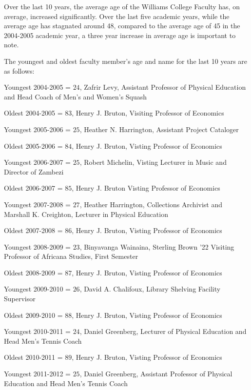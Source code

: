 \documentclass[12pt,a4paper]{article}\usepackage[]{graphicx}\usepackage[]{color}
\theoremstyle{definition}
\begin{document}
\bigskip
Over the last 10 years, the average age of the Williams College Faculty has, on average, increased significantly. Over the last five academic years, while the average age has stagnated around 48, compared to the average age of 45 in the 2004-2005 academic year, a three year increase in average age is important to note.




\bigskip
The youngest and oldest faculty member's age and name for the last 10 years are as follows:

\bigskip
Youngest 2004-2005 = \(24\), Zafrir Levy, Assistant Professor of Physical Education and Head Coach of Men's and Women's Squash

\bigskip
Oldest 2004-2005 = \(83\), Henry J. Bruton, Visiting Professor of Economics

\bigskip
Youngest 2005-2006 = \(25\), Heather N. Harrington, Assistant Project Cataloger

\bigskip
Oldest 2005-2006 = \(84\), Henry J. Bruton, Visting Professor of Economics

\bigskip
Youngest 2006-2007 = \(25\), Robert Michelin, Visting Lecturer in Music and Director of Zambezi

\bigskip
Oldest 2006-2007 = \(85\), Henry J. Bruton Visting Professor of Economics

\bigskip
Youngest 2007-2008 = \(27\), Heather Harrington, Collections Archivist and Marshall K. Creighton, Lecturer in Physical Education

\bigskip
Oldest 2007-2008 = \(86\), Henry J. Bruton, Visting Professor of Economics

\bigskip
Youngest 2008-2009 = \(23\), Binyavanga Wainaina, Sterling Brown '22 Visiting Professor of Africana Studies, First Semester

\bigskip
Oldest 2008-2009 = \(87\), Henry J. Bruton, Visting Professor of Economics

\bigskip
Youngest 2009-2010 = \(26\), David A. Chalifoux, Library Shelving Facility Supervisor

\bigskip
Oldest 2009-2010 = \(88\), Henry J. Bruton, Visting Professor of Economics

\bigskip
Youngest 2010-2011 = \(24\), Daniel Greenberg, Lecturer of Physical Education and Head Men's Tennis Coach

\bigskip
Oldest 2010-2011 = \(89\), Henry J. Bruton, Visting Professor of Economics

\bigskip
Youngest 2011-2012 = \(25\), Daniel Greenberg, Assistant Professor of Physical Education and Head Men's Tennis Coach
\end{document}
